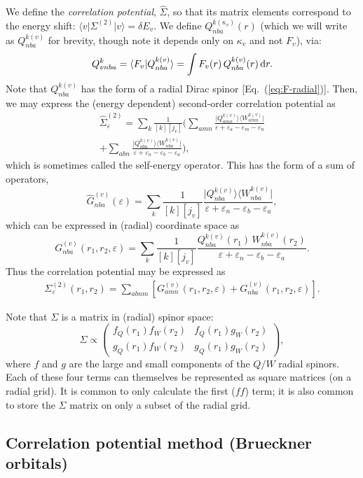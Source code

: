 \documentclass[10pt,twocolumn,a4paper]{article}%
\newcommand{\bra}[1]{\ensuremath{\langle #1|}}	%
\newcommand{\ket}[1]{\ensuremath{|#1\rangle}}	%
\newcommand{\braket}[1]{\ensuremath{\langle #1\rangle}}	%
\newcommand{\matr}[4]{\ensuremath{\begin{pmatrix}#1&#2\\#3&#4\end{pmatrix}}}	%
\newcommand{\be}{\begin{equation}}
\newcommand{\ee}{\end{equation}}
\def\d{\ensuremath{{\rm d}}}
\def\en{\ensuremath{\varepsilon}}
\begin{document}
We define the {\em correlation potential}, $\hat \Sigma$, so that its matrix elements correspond to the energy shift: $\bra{v}\Sigma^{(2)}\ket{v} = \delta E_v$.
We define
$Q^{k(\kappa_v)}_{nba}(r)$ (which we will write as $Q^{k(v)}_{nba}$ for brevity, though note it depends only on $\kappa_v$ and not $F_v$), via:
\be
Q^k_{vnba} 
= \braket{F_v|Q^{k(v)}_{nba}}
= \int F_v(r) \, Q^{k(v)}_{nba}(r)\,\d r.
\ee
Note that $Q_{nba}^{k(v)}$ has the form of a radial Dirac spinor [Eq.~(\ref{eq:F-radial})].
Then, we may express the (energy dependent) second-order correlation potential as
\begin{multline}
\hat \Sigma^{(2)}_{\en} = 
\sum_{k}\frac{1}{[k][j_v]}\Big(
\sum_{amn}\frac{\ket{Q^{k(v)}_{amn}}\bra{W^{k(v)}_{amn}}}
{\en + \en_a-\en_m-\en_n}\\
+
\sum_{abn}\frac{\ket{Q^{k(v)}_{nba}}\bra{W^{k(v)}_{nba}}}
{\en + \en_n-\en_b-\en_a}
\Big),
\end{multline}
which is sometimes called the self-energy operator.
This has the form of a sum of operators,
\be
\hat G^{(v)}_{nba}(\en) = \sum_{k}\frac{1}{[k][j_v]}\frac{\ket{Q^{k(v)}_{nba}}\bra{W^{k(v)}_{nba}}}
{\en+\en_n-\en_b-\en_a},
\ee
which can be expressed in (radial) coordinate space as
\be
G^{(v)}_{nba}(r_1,r_2,\en) = \sum_{k}\frac{1}{[k][j_v]}
\frac{Q^{k(v)}_{nba}(r_1)\, W^{k(v)}_{nba}(r_2)}
{\en + \en_n-\en_b-\en_a}.
\ee
Thus the correlation potential may be expressed as
\begin{multline}
\Sigma^{(2)}_{\en}(r_1,r_2) = 
\sum_{abnm}\left[
G^{(v)}_{amn}(r_1,r_2,\en)
+
G^{(v)}_{nba}(r_1,r_2,\en)
\right].
\end{multline}

Note that $\Sigma$ is a matrix in (radial) spinor space:
\be
\Sigma \propto \matr{f_Q(r_1)f_W(r_2)}{f_Q(r_1)g_W(r_2)}{g_Q(r_1)f_W(r_2)}{g_Q(r_1)g_W(r_2)},
\ee
where $f$ and $g$ are the large and small components of the $Q/W$ radial spinors.
Each of these four terms can themselves be represented as square matrices (on a radial grid).
It is common to only calculate the first ($ff$) term; it is also common to store the $\Sigma$ matrix on only a subset of the radial grid.

\subsection{Correlation potential method (Brueckner orbitals)}
\end{document}
